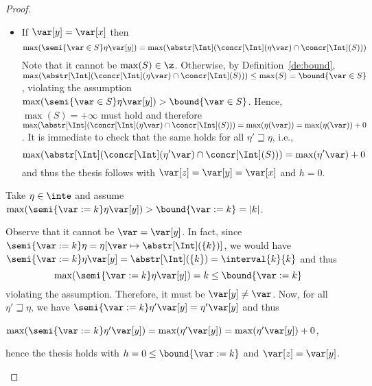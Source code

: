 \begin{proof}
\begin{inductive}
\begin{itemize}
    \item If \(\var[y] = \var[x]\) then
      \begin{equation*}
        \max(\semi{\var \in S}\eta \var[y]) = \max(\abstr[\Int](\concr[\Int](\eta\var) \cap \concr[\Int](S)))
      \end{equation*}
      Note that it cannot be \(\max(S)\in \z\). Otherwise, by
      Definition~\ref{de:bound},
      \(\max ({\abstr[\Int](\concr[\Int](\eta\var) \cap \concr[\Int](S))})
      \leq \max(S)= \bound{\var \in S}\), violating the assumption
      \(\max(\semi{\var \in S}\eta \var[y]) > \bound{\var \in S}\).
      Hence, \(\max(S) = +\infty\) must hold and therefore %
      \(\max ({\abstr[\Int](\concr[\Int](\eta\var) \cap
        \concr[\Int](S))}) = \max(\eta(\var)) = \max(\eta(\var)) +
      0\). It is immediate to check that the same holds for all
      \(\eta' \sqsupseteq \eta\), i.e.,
      \begin{equation*}
        \max(\abstr[\Int](\concr[\Int](\eta'\var) \cap \concr[\Int](S))) = \max(\eta'\var) + 0
      \end{equation*}
      and thus the thesis follows with  \(\var[z]=\var[y]=\var[x]\) and \(h=0\).
    \end{itemize}  
    
    Take \(\eta \in \inte\) and assume
    \(\max(\semi{\var := k}\eta \var[y]) > \bound{\var := k} = |k|\).

    Observe that it cannot be \(\var = \var[y]\). In fact, since
    \(\semi{\var := k}\eta = \eta[\var \mapsto \abstr[\Int](\{k\})]\),
    we would have
    \(\semi{\var := k}\eta \var[y] = \abstr[\Int](\{k\}) =
    \interval{k}{k}\) and thus %
    \begin{equation*}
      \max(\semi{\var := k}\eta \var[y]) = k  \leq \bound{\var := k}
    \end{equation*}
    violating the assumption.
    Therefore, it must be \(\var[y] \neq \var\). Now, for all
    \(\eta' \sqsupseteq \eta\), we have
    \(\semi{\var := k}\eta' \var[y] = \eta' \var[y]\) and thus
    \begin{center}
      \(\max(\semi{\var := k}\eta' \var[y]) = \max(\eta' \var[y]) =
      \max(\eta' \var[y]) + 0\),
    \end{center}
    hence the thesis holds with \(h =0 \leq \bound{\var :=k}\) and \(\var[z] = \var[y]\).
    

\end{inductive}
\end{proof}
